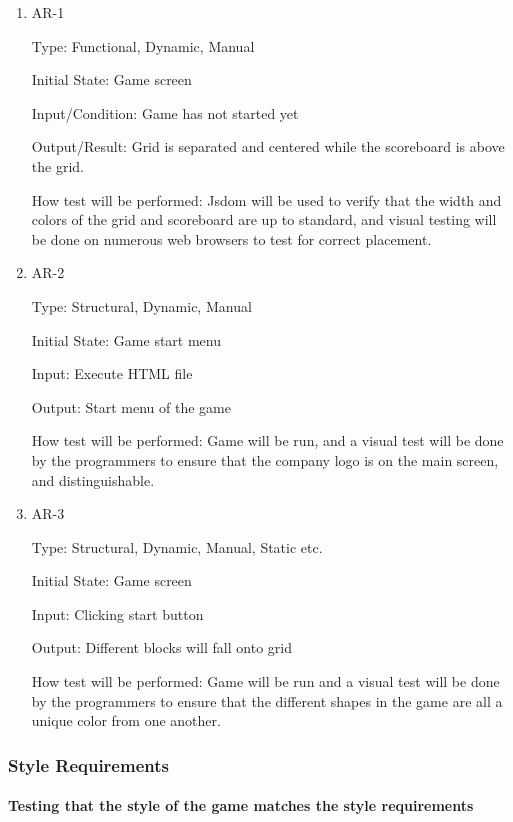 \documentclass[12pt, titlepage]{article}
\begin{document}
\begin{enumerate}

\item{AR-1\\}

Type: Functional, Dynamic, Manual
					
Initial State: Game screen 
					
Input/Condition: Game has not started yet  
					
Output/Result: Grid is separated and centered while the scoreboard is above the grid.
					
How test will be performed: Jsdom will be used to verify that the width and colors of the grid and scoreboard are up to standard, and visual testing will be done on numerous web browsers to test for correct placement.
					
\item{AR-2\\}

Type: Structural, Dynamic, Manual
					
Initial State: Game start menu
					
Input: Execute HTML file
					
Output: Start menu of the game
					
How test will be performed: Game will be run, and a visual test will be done by the programmers to ensure that the company logo is on the main screen, and distinguishable. 

\item{AR-3\\}

Type: Structural, Dynamic, Manual, Static etc.
					
Initial State: Game screen
					
Input: Clicking start button 
					
Output: Different blocks will fall onto grid
					
How test will be performed: Game will be run and a visual test will be done by the programmers to ensure that the different shapes in the game are all a unique color from one another. 

\end{enumerate}

\subsubsection{Style Requirements}
\paragraph{Testing that the style of the game matches the style requirements}
\end{document}
